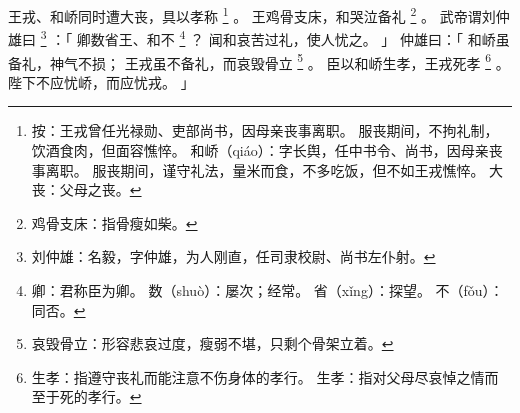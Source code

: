 
\switchcolumn*[\section{}]

王戎、和峤同时遭大丧，具以孝称%
\footnote{%
    按：王戎曾任光禄勋、吏部尚书，因母亲丧事离职。
        服丧期间，不拘礼制，饮酒食肉，但面容憔悴。
    和峤（qiáo）：字长舆，任中书令、尚书，因母亲丧事离职。
                  服丧期间，谨守礼法，量米而食，不多吃饭，但不如王戎憔悴。
    大丧：父母之丧。
}%
。
王鸡骨支床，和哭泣备礼%
\footnote{%
    鸡骨支床：指骨瘦如柴。
}%
。
武帝谓刘仲雄曰%
\footnote{%
    刘仲雄：名毅，字仲雄，为人刚直，任司隶校尉、尚书左仆射。
}%
：「
    卿数省王、和不%
    \footnote{%
        卿：君称臣为卿。
        数（shuò）：屡次；经常。
        省（xǐng）：探望。
        不（fǒu）：同否。
    }%
    ？
    闻和哀苦过礼，使人忧之。
」
仲雄曰：「
    和峤虽备礼，神气不损；
    王戎虽不备礼，而哀毁骨立%
    \footnote{%
        哀毁骨立：形容悲哀过度，瘦弱不堪，只剩个骨架立着。
    }%
    。
    臣以和峤生孝，王戎死孝%
    \footnote{%
        生孝：指遵守丧礼而能注意不伤身体的孝行。
        生孝：指对父母尽哀悼之情而至于死的孝行。
    }%
    。
    陛下不应忧峤，而应忧戎。
」

\switchcolumn


